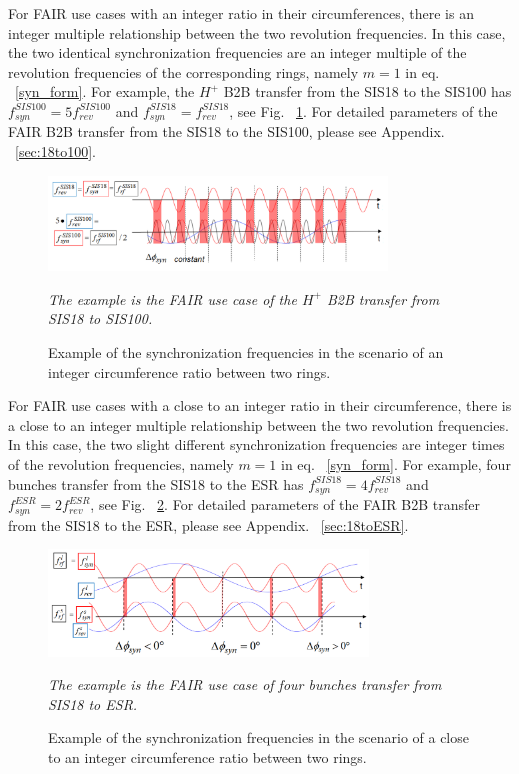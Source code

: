 For FAIR use cases with an integer ratio in their circumferences, there is an integer multiple relationship between the two revolution frequencies. In this case, the two identical synchronization frequencies are an integer multiple of the revolution frequencies of the corresponding rings, namely $m=1$ in eq. ~\ref{syn_form}. For example, the $H^{+}$ B2B transfer from the SIS18 to the SIS100 has $f_{\mathit{syn}}^{SIS100}=5f_{\mathit{rev}}^{SIS100}$ and $f_{\mathit{syn}}^{SIS18}=f_{\mathit{rev}}^{SIS18}$, see Fig. ~\ref{USIS18}. For detailed parameters of the FAIR B2B transfer from the SIS18 to the SIS100, please see Appendix. ~\ref{sec:18to100}.
\begin{figure}[!htb]
   \centering   
   \includegraphics*[width=90mm]{USIS18.png}
   \caption{Example of the synchronization frequencies in the scenario of an integer circumference ratio between two rings.}
{\textsl{\small{The example is the FAIR use case of the $H^{+}$ B2B transfer from SIS18 to SIS100.}}}
   \label{USIS18}
\end{figure} 

For FAIR use cases with a close to an integer ratio in their circumference, there is a close to an integer multiple relationship between the two revolution frequencies. In this case, the two slight different synchronization frequencies are integer times of the revolution frequencies, namely $m=1$ in eq. ~\ref{syn_form}. For example, four bunches transfer from the SIS18 to the ESR has $f_{\mathit{syn}}^{SIS18}=4f_{\mathit{rev}}^{SIS18}$ and $f_{\mathit{syn}}^{ESR}=2f_{\mathit{rev}}^{ESR}$, see Fig. ~\ref{ESR}. For detailed parameters of the FAIR B2B transfer from the SIS18 to the ESR, please see Appendix. ~\ref{sec:18toESR}.
\begin{figure}[!htb]
   \centering   
   \includegraphics*[width=85mm]{cir_noint.jpg}
   \caption{Example of the synchronization frequencies in the scenario of a close to an integer circumference ratio between two rings.}
{\textsl{\small{The example is the FAIR use case of four bunches transfer from SIS18 to ESR.}}}
   \label{ESR}
\end{figure} 

